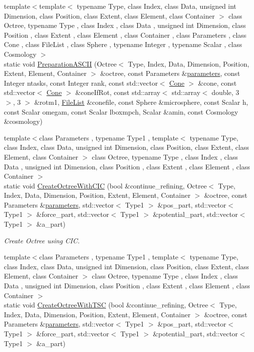 \begin{DoxyCompactItemize}
{\footnotesize template$<$template$<$ typename Type, class Index, class Data, unsigned int Dimension, class Position, class Extent, class Element, class Container $>$ class Octree, typename Type , class Index , class Data , unsigned int Dimension, class Position , class Extent , class Element , class Container , class Parameters , class Cone , class File\-List , class Sphere , typename Integer , typename Scalar , class Cosmology $>$ }\\static void \hyperlink{classCreate__octree_ab8d673029a2e1fceeec75e0aa2331a4f}{Preparation\-A\-S\-C\-I\-I} (Octree$<$ Type, Index, Data, Dimension, Position, Extent, Element, Container $>$ \&octree, const Parameters \&\hyperlink{rays_8h_ae1bc8b0b8c8b9f8e4cc61a5cc7c4ce9e}{parameters}, const Integer ntasks, const Integer rank, const std\-::vector$<$ \hyperlink{exceptionCone}{Cone} $>$ \&cone, const std\-::vector$<$ \hyperlink{exceptionCone}{Cone} $>$ \&cone\-If\-Rot, const std\-::array$<$ std\-::array$<$ double, 3 $>$, 3 $>$ \&rotm1, \hyperlink{exceptionmagrathea_1_1FileList}{File\-List} \&conefile, const Sphere \&microsphere, const Scalar h, const Scalar omegam, const Scalar lboxmpch, Scalar \&amin, const Cosmology \&cosmology)
\item 
{\footnotesize template$<$class Parameters , typename Type1 , template$<$ typename Type, class Index, class Data, unsigned int Dimension, class Position, class Extent, class Element, class Container $>$ class Octree, typename Type , class Index , class Data , unsigned int Dimension, class Position , class Extent , class Element , class Container $>$ }\\static void \hyperlink{classCreate__octree_a19115f98a9951649e441c9f4191b228a}{Create\-Octree\-With\-C\-I\-C} (bool \&continue\-\_\-refining, Octree$<$ Type, Index, Data, Dimension, Position, Extent, Element, Container $>$ \&octree, const Parameters \&\hyperlink{rays_8h_ae1bc8b0b8c8b9f8e4cc61a5cc7c4ce9e}{parameters}, std\-::vector$<$ Type1 $>$ \&pos\-\_\-part, std\-::vector$<$ Type1 $>$ \&force\-\_\-part, std\-::vector$<$ Type1 $>$ \&potential\-\_\-part, std\-::vector$<$ Type1 $>$ \&a\-\_\-part)
\begin{DoxyCompactList}\small\item\em Create Octree using C\-I\-C. \end{DoxyCompactList}\item 
{\footnotesize template$<$class Parameters , typename Type1 , template$<$ typename Type, class Index, class Data, unsigned int Dimension, class Position, class Extent, class Element, class Container $>$ class Octree, typename Type , class Index , class Data , unsigned int Dimension, class Position , class Extent , class Element , class Container $>$ }\\static void \hyperlink{classCreate__octree_ace0cf97315351461c23359ef93f31000}{Create\-Octree\-With\-T\-S\-C} (bool \&continue\-\_\-refining, Octree$<$ Type, Index, Data, Dimension, Position, Extent, Element, Container $>$ \&octree, const Parameters \&\hyperlink{rays_8h_ae1bc8b0b8c8b9f8e4cc61a5cc7c4ce9e}{parameters}, std\-::vector$<$ Type1 $>$ \&pos\-\_\-part, std\-::vector$<$ Type1 $>$ \&force\-\_\-part, std\-::vector$<$ Type1 $>$ \&potential\-\_\-part, std\-::vector$<$ Type1 $>$ \&a\-\_\-part)

\end{DoxyCompactItemize}
